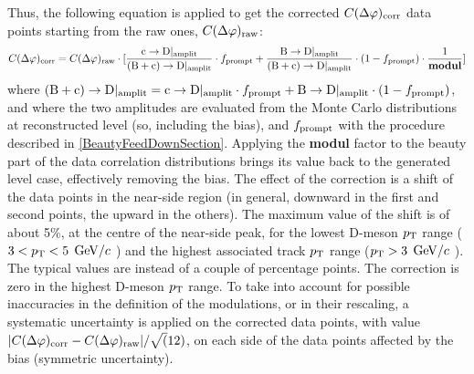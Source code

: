 Thus, the following equation is applied to get the corrected $C(\Delta\varphi)_{\rm corr}$ data points starting from the raw ones, $C(\Delta\varphi)_{\rm raw}$:
\begin{equation}
C(\Delta\varphi)_{\rm corr} = C(\Delta\varphi)_{\rm raw} \cdot [\frac{{\rm c}\rightarrow{\rm D}|_{\rm amplit}}{{\rm (B+c)}\rightarrow{\rm D}|_{\rm amplit}} \cdot f_{\rm prompt} + \frac{{\rm B}\rightarrow{\rm D}|_{\rm amplit}}{{\rm (B+c)}\rightarrow{\rm D}|_{\rm amplit}} \cdot (1-f_{\rm prompt})\cdot\frac{1}{\bf modul}]
\end{equation}
where ${\rm (B+c)}\rightarrow{\rm D}|_{\rm amplit} = {\rm c}\rightarrow{\rm D}|_{\rm amplit} \cdot f_{\rm prompt} + {\rm B}\rightarrow{\rm D}|_{\rm amplit} \cdot (1-f_{\rm prompt})$, and where the two amplitudes are evaluated from the Monte Carlo distributions at reconstructed level (so, including the bias), and $f_{\rm prompt}$ with the procedure described in \ref{BeautyFeedDownSection}.
Applying the {\bf modul} factor to the beauty part of the data correlation distributions brings its value back to the generated level case, effectively removing the bias.
The effect of the correction is a shift of the data points in the near-side region (in general, downward in the first and second points, the upward in the others). The maximum value of the shift is of about 5\%, at the centre of the near-side peak, for the lowest D-meson $p_{\rm T}$ range ($3 < p_{\rm T} < 5$ $\mathrm{GeV}/c$ ) and the highest associated track $p_{\rm T}$ range ($p_{\rm T} > 3$ $\mathrm{GeV}/c$ ). The typical values are instead of a couple of percentage points. The correction is zero in the highest D-meson $p_{\rm T}$ range.
To take into account for possible inaccuracies in the definition of the modulations, or in their rescaling, a systematic uncertainty is  applied on the corrected data points, with value $|C(\Delta\varphi)_{\rm corr} - C(\Delta\varphi)_{\rm raw}|/\sqrt(12)$, on each side of the data points affected by the bias (symmetric uncertainty).

\clearpage
%
